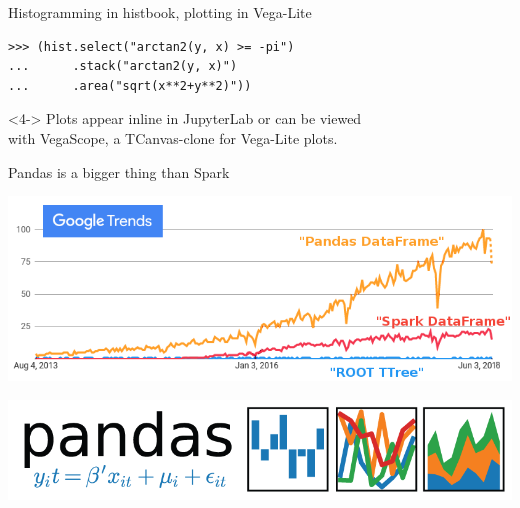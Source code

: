 \documentclass[aspectratio=169]{beamer}
\begin{document}
\begin{frame}[fragile]{Histogramming in histbook, plotting in Vega-Lite}
\begin{uncoverenv}
\vspace{-2.5 cm}
\scriptsize
\begin{verbatim}
>>> (hist.select("arctan2(y, x) >= -pi")
...      .stack("arctan2(y, x)")
...      .area("sqrt(x**2+y**2)"))
\end{verbatim}
\normalsize
\end{uncoverenv}

\vspace{0.2 cm}
\begin{uncoverenv}<4->
Plots appear inline in JupyterLab or can be viewed \\
with VegaScope, a TCanvas-clone for Vega-Lite plots.
\end{uncoverenv}
\end{frame}

\begin{frame}{Pandas is a bigger thing than Spark}
\vspace{0.5 cm}
\begin{center}
\includegraphics[width=0.8\linewidth]{root-spark-pandas-google-trends.png}

\vspace{1 cm}
\includegraphics[width=0.5\linewidth]{pandas-logo.png}
\end{center}
\end{frame}
\end{document}
